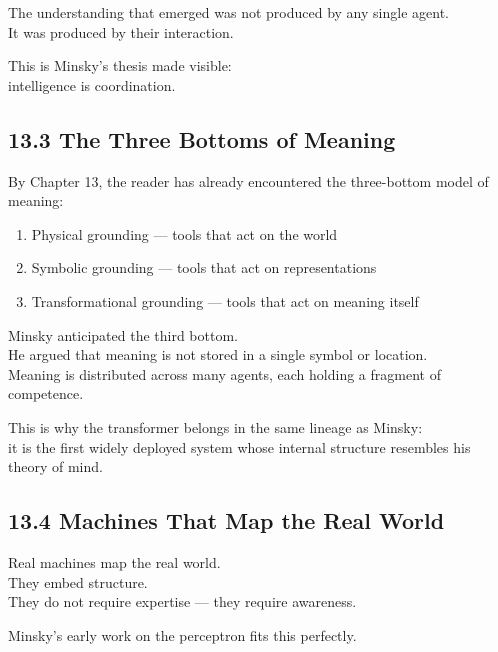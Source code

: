 The understanding that emerged was not produced by any single agent.\\
It was produced by their interaction.

This is Minsky's thesis made visible:\\
intelligence is coordination.

\hypertarget{the-three-bottoms-of-meaning}{%
\subsection{13.3 The Three Bottoms of
Meaning}\label{the-three-bottoms-of-meaning}}

By Chapter 13, the reader has already encountered the three-bottom model
of meaning:

\begin{enumerate}
\def\labelenumi{\arabic{enumi}.}
\tightlist
\item
  Physical grounding --- tools that act on the world\\
\item
  Symbolic grounding --- tools that act on representations\\
\item
  Transformational grounding --- tools that act on meaning itself
\end{enumerate}

Minsky anticipated the third bottom.\\
He argued that meaning is not stored in a single symbol or location.\\
Meaning is distributed across many agents, each holding a fragment of
competence.

This is why the transformer belongs in the same lineage as Minsky:\\
it is the first widely deployed system whose internal structure
resembles his theory of mind.

\hypertarget{machines-that-map-the-real-world}{%
\subsection{13.4 Machines That Map the Real
World}\label{machines-that-map-the-real-world}}

Real machines map the real world.\\
They embed structure.\\
They do not require expertise --- they require awareness.

Minsky's early work on the perceptron fits this perfectly.

